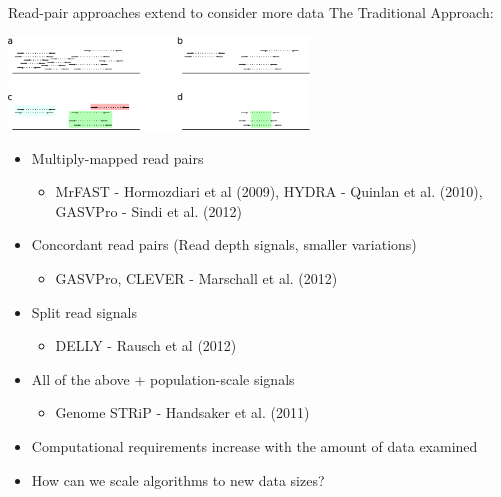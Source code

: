 \documentclass{beamer}
\begin{document}
\begin{frame}{Read-pair approaches extend to consider more data}
The Traditional Approach:
 \begin{center}
     \includegraphics[width=0.6\textwidth]{rp_method_workflow.pdf}
   \end{center}
\fontsize{10pt}{10}\selectfont
\begin{itemize}
\item Multiply-mapped read pairs
\begin{itemize}
\item MrFAST - Hormozdiari et al (2009), HYDRA - Quinlan et al. (2010), GASVPro - Sindi et al. (2012)
\end{itemize}
\item Concordant read pairs (Read depth signals, smaller variations)
\begin{itemize}
\item GASVPro, CLEVER - Marschall et al. (2012)
\end{itemize}
\item Split read signals
\begin{itemize}
\item DELLY - Rausch et al (2012)
\end{itemize}
\item All of the above + population-scale signals
\begin{itemize}
\item Genome STRiP - Handsaker et al. (2011)
\end{itemize}
\item Computational requirements increase with the amount of data examined
\item How can we scale algorithms to new data sizes?
\end{itemize}
\end{frame}
\end{document}
